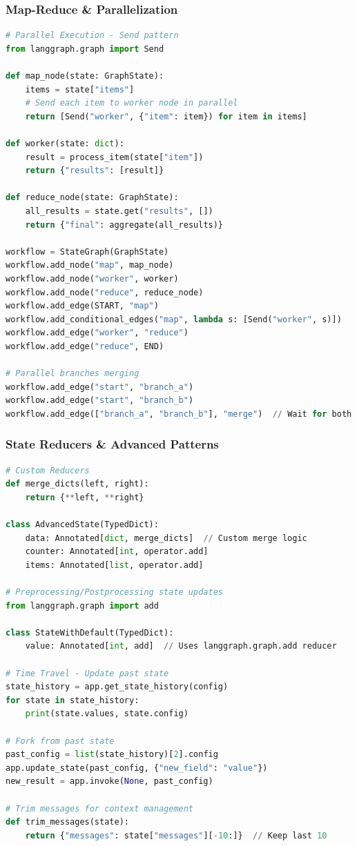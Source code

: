 \begin{frame}[fragile]\frametitle{Map-Reduce \& Parallelization}
      \begin{lstlisting}[language=python]
# Parallel Execution - Send pattern
from langgraph.graph import Send

def map_node(state: GraphState):
    items = state["items"]
    # Send each item to worker node in parallel
    return [Send("worker", {"item": item}) for item in items]

def worker(state: dict):
    result = process_item(state["item"])
    return {"results": [result]}

def reduce_node(state: GraphState):
    all_results = state.get("results", [])
    return {"final": aggregate(all_results)}

workflow = StateGraph(GraphState)
workflow.add_node("map", map_node)
workflow.add_node("worker", worker)
workflow.add_node("reduce", reduce_node)
workflow.add_edge(START, "map")
workflow.add_conditional_edges("map", lambda s: [Send("worker", s)])
workflow.add_edge("worker", "reduce")
workflow.add_edge("reduce", END)

# Parallel branches merging
workflow.add_edge("start", "branch_a")
workflow.add_edge("start", "branch_b")
workflow.add_edge(["branch_a", "branch_b"], "merge")  // Wait for both
  \end{lstlisting}
\end{frame}

\begin{frame}[fragile]\frametitle{State Reducers \& Advanced Patterns}
      \begin{lstlisting}[language=python]
# Custom Reducers
def merge_dicts(left, right):
    return {**left, **right}

class AdvancedState(TypedDict):
    data: Annotated[dict, merge_dicts]  // Custom merge logic
    counter: Annotated[int, operator.add]
    items: Annotated[list, operator.add]

# Preprocessing/Postprocessing state updates
from langgraph.graph import add

class StateWithDefault(TypedDict):
    value: Annotated[int, add]  // Uses langgraph.graph.add reducer

# Time Travel - Update past state
state_history = app.get_state_history(config)
for state in state_history:
    print(state.values, state.config)

# Fork from past state
past_config = list(state_history)[2].config
app.update_state(past_config, {"new_field": "value"})
new_result = app.invoke(None, past_config)

# Trim messages for context management
def trim_messages(state):
    return {"messages": state["messages"][-10:]}  // Keep last 10
  \end{lstlisting}
\end{frame}

